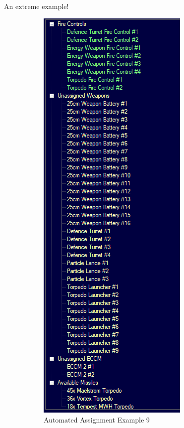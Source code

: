 \documentclass[../../Aurora C# unofficial manual.tex]{subfiles}
\begin{document}
	An extreme example!
	\begin{figure}[H]
		\centering
		\begin{subfigure}{.5\textwidth}
			\centering
			\includegraphics[width=0.5\linewidth]{images/AutomatedAssignment9}
			\caption[Automated Assignment]{Automated Assignment Example 9}
			\label{fig:automatedassignment9}
		\end{subfigure}%
		\begin{subfigure}{.5\textwidth}
			\centering

\end{subfigure}
\end{figure}
\end{document}
